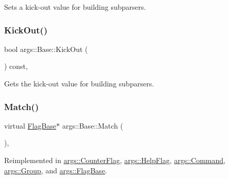 Sets a kick-\/out value for building subparsers. 

\mbox{\label{classargs_1_1_base_a83a630e1e05295ab6d2610d2a68082b6}} 
\subsubsection{\texorpdfstring{Kick\+Out()}{KickOut()}\hspace{0.1cm}{\footnotesize\ttfamily [2/2]}}
{\footnotesize\ttfamily bool args\+::\+Base\+::\+Kick\+Out (\begin{DoxyParamCaption}{ }\end{DoxyParamCaption}) const\hspace{0.3cm}{\ttfamily [inline]}, {\ttfamily [noexcept]}}



Gets the kick-\/out value for building subparsers. 

\mbox{\label{classargs_1_1_base_a6d5a7be35d62f59fee5a52c06af3003e}} 
\subsubsection{\texorpdfstring{Match()}{Match()}}
{\footnotesize\ttfamily virtual \hyperlink{classargs_1_1_flag_base}{Flag\+Base}$\ast$ args\+::\+Base\+::\+Match (\begin{DoxyParamCaption}\item[{const \hyperlink{structargs_1_1_either_flag}{Either\+Flag} \&}]{ }\end{DoxyParamCaption})\hspace{0.3cm}{\ttfamily [inline]}, {\ttfamily [virtual]}}



Reimplemented in \hyperlink{classargs_1_1_counter_flag_ade999a8d89a8fd3db7508dfe7fdf851c}{args\+::\+Counter\+Flag}, \hyperlink{classargs_1_1_help_flag_a1a555992a7c8350aca0ac1f292d91605}{args\+::\+Help\+Flag}, \hyperlink{classargs_1_1_command_ace018e92977b0e6ec5472cae0166523c}{args\+::\+Command}, \hyperlink{classargs_1_1_group_a31872f412d5b32e0afaf962cd2ce5e40}{args\+::\+Group}, and \hyperlink{classargs_1_1_flag_base_a729ebb681d373f09875abb2e04f820f2}{args\+::\+Flag\+Base}.

